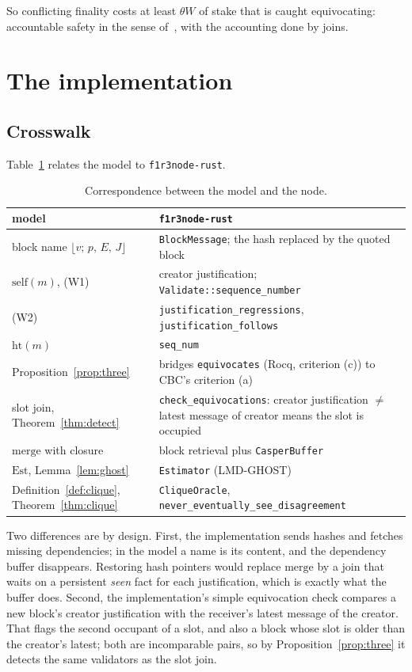 \documentclass[11pt]{article}
\theoremstyle{definition}
\theoremstyle{remark}
\newcommand{\blk}[4]{\lfloor #1;\, #2,\, #3,\, #4\rfloor}
\newcommand{\slf}{\mathrm{self}}
\newcommand{\Est}{\mathrm{Est}}
\newcommand{\merge}{\mathrm{merge}}
\newcommand{\hgt}{\mathrm{ht}}
\begin{document}
So conflicting finality costs at least $\theta W$ of stake that is caught
equivocating: accountable safety in the sense of~\cite{cbc}, with the
accounting done by joins.

\section{The implementation}\label{sec:impl}

\subsection{Crosswalk}

Table~\ref{tab:cross} relates the model to \texttt{f1r3node-rust}.

\begin{table}[ht]
\centering
\small
\begin{tabular}{@{}p{}p{}@{}}
\toprule
model & \texttt{f1r3node-rust}\\
\midrule
block name $\blk{v}{p}{E}{J}$ & \texttt{BlockMessage}; the hash replaced by the
  quoted block\\
$\slf(m)$, (W1) & creator justification; \texttt{Validate::sequence\_number}\\
(W2) & \texttt{justification\_regressions},
  \texttt{justification\_follows}\\
$\hgt(m)$ & \texttt{seq\_num}\\
Proposition~\ref{prop:three} & bridges \texttt{equivocates} (Rocq,
  criterion (c)) to CBC's criterion (a)\\
slot join, Theorem~\ref{thm:detect} & \texttt{check\_equivocations}: creator
  justification $\ne$ latest message of creator means the slot is occupied\\
$\merge$ with closure & block retrieval plus \texttt{CasperBuffer}\\
$\Est$, Lemma~\ref{lem:ghost} & \texttt{Estimator} (LMD-GHOST)\\
Definition~\ref{def:clique}, Theorem~\ref{thm:clique} &
  \texttt{CliqueOracle}, \texttt{never\_eventually\_see\_disagreement}\\
\bottomrule
\end{tabular}
\caption{Correspondence between the model and the node.}
\label{tab:cross}
\end{table}

Two differences are by design. First, the implementation sends hashes and
fetches missing dependencies; in the model a name is its content, and the
dependency buffer disappears. Restoring hash pointers would replace $\merge$ by
a join that waits on a persistent \emph{seen} fact for each justification,
which is exactly what the buffer does. Second, the implementation's simple
equivocation check compares a new block's creator justification with the
receiver's latest message of the creator. That flags the second occupant of a
slot, and also a block whose slot is older than the creator's latest; both are
incomparable pairs, so by Proposition~\ref{prop:three} it detects the same
validators as the slot join.
\end{document}
